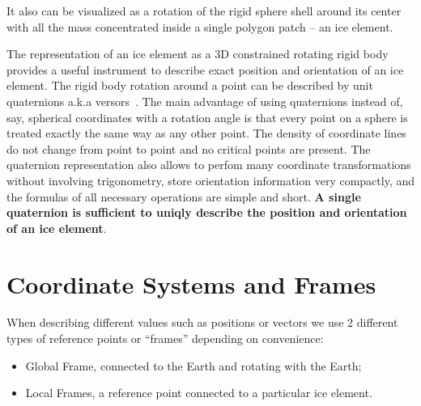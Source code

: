 It also can be visualized as a rotation of the rigid sphere shell
around its center with all the mass concentrated inside a single
polygon patch -- an ice element.

The representation of an ice element as a 3D constrained rotating
rigid body provides a useful instrument to describe exact position and
orientation of an ice element. The rigid body rotation around a point
can be described by unit quaternions a.k.a
versors~\cite{bib:graf2008quaternions, bib:waldvogel2008quaternions,
  bib:arribas2006quaternions, bib:nemes2013perturbed}. The main
advantage of using quaternions instead of, say, spherical coordinates
with a rotation angle is that every point on a sphere is treated
exactly the same way as any other point. The density of coordinate
lines do not change from point to point and no critical points are
present. The quaternion representation also allows to perfom many
coordinate transformations without involving trigonometry, store
orientation information very compactly, and the formulas of all
necessary operations are simple and short. \textbf{A single quaternion
  is sufficient to uniqly describe the position and orientation of an
  ice element}.

\section{Coordinate Systems and Frames}\label{sec:frames}

When describing different values such as positions or vectors we use 2
different types of reference points or ``frames'' depending on
convenience:
\begin{itemize}
\item Global Frame, connected to the Earth and rotating with the
  Earth;
\item Local Frames, a reference point connected to a particular ice
  element.
\end{itemize}


